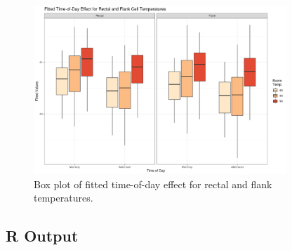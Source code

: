 \documentclass[a4paper, 10pt, titlepage]{article}
\begin{document}
\begin{figure}[!htbp]
	\centering
		\includegraphics[width = 0.85\textwidth]{images/tod_effect_plot.png}
	\caption{Box plot of fitted time-of-day effect for rectal and flank temperatures.}
\end{figure}

\clearpage

\subsection{R Output}
\end{document}
